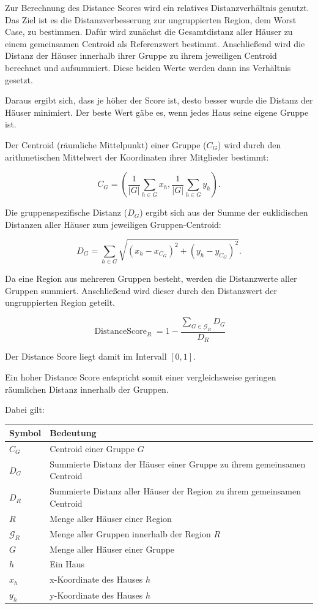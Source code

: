 Zur Berechnung des Distance Scores wird ein relatives Distanzverhältnis genutzt. Das Ziel ist es die Distanzverbesserung zur ungruppierten Region, dem Worst Case, zu bestimmen. Dafür wird zunächst die Gesamtdistanz aller Häuser zu einem gemeinsamen Centroid als Referenzwert bestimmt. Anschließend wird die Distanz der Häuser innerhalb ihrer Gruppe zu ihrem jeweiligen Centroid berechnet und aufsummiert. Diese beiden Werte werden dann ins Verhältnis gesetzt.

Daraus ergibt sich, dass je höher der Score ist, desto besser wurde die Distanz der Häuser minimiert. Der beste Wert gäbe es, wenn jedes Haus seine eigene Gruppe ist.

Der Centroid (räumliche Mittelpunkt) einer Gruppe ($C_G$) wird durch den arithmetischen Mittelwert der Koordinaten ihrer Mitglieder bestimmt:

\begin{equation}
C_G
=
\left(
\frac{1}{|G|}\sum_{h\in G}x_h,
\frac{1}{|G|}\sum_{h\in G}y_h
\right).
\end{equation}

Die gruppenspezifische Distanz ($D_G$) ergibt sich aus der Summe der euklidischen Distanzen aller Häuser zum jeweiligen Gruppen-Centroid:

\begin{equation}
D_G
=
\sum_{h\in G}
\sqrt{
(x_h-x_{C_G})^2
+
(y_h-y_{C_G})^2
}.
\end{equation}

Da eine Region aus mehreren Gruppen besteht, werden die Distanzwerte aller Gruppen summiert. Anschließend wird dieser durch den Distanzwert der ungruppierten Region geteilt.

\begin{equation}
\boxed{
\operatorname{DistanceScore}_R
=
1-
\frac{\sum_{G\in\mathcal{G}_R}D_G}{D_R}
}
\end{equation}

Der Distance Score liegt damit im Intervall $[0,1]$.

Ein hoher Distance Score entspricht somit einer vergleichsweise geringen räumlichen Distanz innerhalb der Gruppen.

Dabei gilt:

\begin{tabular}{ll}
\textbf{Symbol} & \textbf{Bedeutung} \\ \hline
$C_G$ & Centroid einer Gruppe $G$ \\ 
$D_G$ & Summierte Distanz der Häuser einer Gruppe zu ihrem gemeinsamen Centroid \\ 
$D_R$ & Summierte Distanz aller Häuser der Region zu ihrem gemeinsamen Centroid \\
$R$ & Menge aller Häuser einer Region \\
$\mathcal{G}_R$ & Menge aller Gruppen innerhalb der Region $R$ \\
$G$ & Menge aller Häuser einer Gruppe \\
$h$ & Ein Haus \\
$x_h$ & x-Koordinate des Hauses $h$ \\ 
$y_h$ & y-Koordinate des Hauses $h$\\
\end{tabular}

